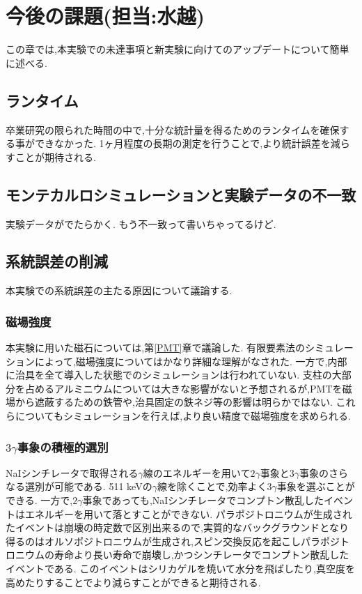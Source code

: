 \chapter{今後の課題(担当:水越)}\label{prospect}

この章では,本実験での未達事項と新実験に向けてのアップデートについて簡単に述べる.

\section{ランタイム}
卒業研究の限られた時間の中で,十分な統計量を得るためのランタイムを確保する事ができなかった.
1ヶ月程度の長期の測定を行うことで,より統計誤差を減らすことが期待される.

\section{モンテカルロシミュレーションと実験データの不一致}
実験データがでたらかく.
もう不一致って書いちゃってるけど.

\section{系統誤差の削減}
本実験での系統誤差の主たる原因について議論する.

\subsection{磁場強度}
本実験に用いた磁石については,第\ref{PMT}章で議論した.
有限要素法のシミュレーションによって,磁場強度についてはかなり詳細な理解がなされた.
一方で,内部に治具を全て導入した状態でのシミュレーションは行われていない.
支柱の大部分を占めるアルミニウムについては大きな影響がないと予想されるが,PMTを磁場から遮蔽するための鉄管や,治具固定の鉄ネジ等の影響は明らかではない.
これらについてもシミュレーションを行えば,より良い精度で磁場強度を求められる.

\subsection{$3\gamma$事象の積極的選別}
NaIシンチレータで取得される$\gamma$線のエネルギーを用いて$2\gamma$事象と$3\gamma$事象のさらなる選別が可能である.
511 keVの$\gamma$線を除くことで,効率よく$3\gamma$事象を選ぶことができる.
一方で,$2\gamma$事象であっても,NaIシンチレータでコンプトン散乱したイベントはエネルギーを用いて落とすことができない.
パラポジトロニウムが生成されたイベントは崩壊の時定数で区別出来るので,実質的なバックグラウンドとなり得るのはオルソポジトロニウムが生成され,スピン交換反応を起こしパラポジトロニウムの寿命より長い寿命で崩壊し,かつシンチレータでコンプトン散乱したイベントである.
このイベントはシリカゲルを焼いて水分を飛ばしたり,真空度を高めたりすることでより減らすことができると期待される.


